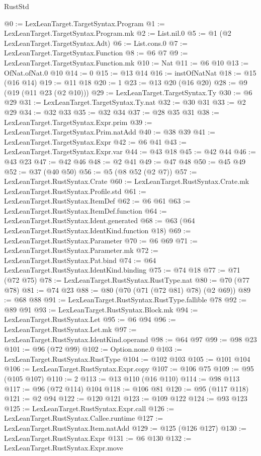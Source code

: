 \begin{lexlean}{RustStd}
\begin{coremodule}
@0 := LexLeanTarget.TargetSyntax.Program
@1 := LexLeanTarget.TargetSyntax.Program.mk
@2 := List.nil.{0}
@5 := @1 (@2 LexLeanTarget.TargetSyntax.Adt)
@6 := List.cons.{0}
@7 := LexLeanTarget.TargetSyntax.Function
@8 := @6 @7
@9 := LexLeanTarget.TargetSyntax.Function.mk
@10 := Nat
@11 := @6 @10
@13 := OfNat.ofNat.{0} @10
@14 := 0
@15 := @13 @14
@16 := instOfNatNat
@18 := @15 (@16 @14)
@19 := @11 @18
@20 := 1
@23 := @13 @20 (@16 @20)
@28 := @9 (@19 (@11 @23 (@2 @10)))
@29 := LexLeanTarget.TargetSyntax.Ty
@30 := @6 @29
@31 := LexLeanTarget.TargetSyntax.Ty.nat
@32 := @30 @31
@33 := @2 @29
@34 := @32 @33
@35 := @32 @34
@37 := @28 @35 @31
@38 := LexLeanTarget.TargetSyntax.Expr.prim
@39 := LexLeanTarget.TargetSyntax.Prim.natAdd
@40 := @38 @39
@41 := LexLeanTarget.TargetSyntax.Expr
@42 := @6 @41
@43 := LexLeanTarget.TargetSyntax.Expr.var
@44 := @43 @18
@45 := @42 @44
@46 := @43 @23
@47 := @42 @46
@48 := @2 @41
@49 := @47 @48
@50 := @45 @49
@52 := @37 (@40 @50)
@56 := @5 (@8 @52 (@2 @7))
@57 := LexLeanTarget.RustSyntax.Crate
@60 := LexLeanTarget.RustSyntax.Crate.mk LexLeanTarget.RustSyntax.Profile.std
@61 := LexLeanTarget.RustSyntax.ItemDef
@62 := @6 @61
@63 := LexLeanTarget.RustSyntax.ItemDef.function
@64 := LexLeanTarget.RustSyntax.Ident.generated
@68 := @63 (@64 LexLeanTarget.RustSyntax.IdentKind.function @18)
@69 := LexLeanTarget.RustSyntax.Parameter
@70 := @6 @69
@71 := LexLeanTarget.RustSyntax.Parameter.mk
@72 := LexLeanTarget.RustSyntax.Pat.bind
@74 := @64 LexLeanTarget.RustSyntax.IdentKind.binding
@75 := @74 @18
@77 := @71 (@72 @75)
@78 := LexLeanTarget.RustSyntax.RustType.nat
@80 := @70 (@77 @78)
@81 := @74 @23
@88 := @80 (@70 (@71 (@72 @81) @78) (@2 @69))
@89 := @68 @88
@91 := LexLeanTarget.RustSyntax.RustType.fallible @78
@92 := @89 @91
@93 := LexLeanTarget.RustSyntax.Block.mk
@94 := LexLeanTarget.RustSyntax.Let
@95 := @6 @94
@96 := LexLeanTarget.RustSyntax.Let.mk
@97 := LexLeanTarget.RustSyntax.IdentKind.operand
@98 := @64 @97
@99 := @98 @23
@101 := @96 (@72 @99)
@102 := Option.none.{0}
@103 := LexLeanTarget.RustSyntax.RustType
@104 := @102 @103
@105 := @101 @104
@106 := LexLeanTarget.RustSyntax.Expr.copy
@107 := @106 @75
@109 := @95 (@105 @107)
@110 := 2
@113 := @13 @110 (@16 @110)
@114 := @98 @113
@117 := @96 (@72 @114) @104
@118 := @106 @81
@120 := @95 (@117 @118)
@121 := @2 @94
@122 := @120 @121
@123 := @109 @122
@124 := @93 @123
@125 := LexLeanTarget.RustSyntax.Expr.call
@126 := LexLeanTarget.RustSyntax.Callee.runtime
@127 := LexLeanTarget.RustSyntax.Item.natAdd
@129 := @125 (@126 @127)
@130 := LexLeanTarget.RustSyntax.Expr
@131 := @6 @130
@132 := LexLeanTarget.RustSyntax.Expr.move

\end{coremodule}
\end{lexlean}
